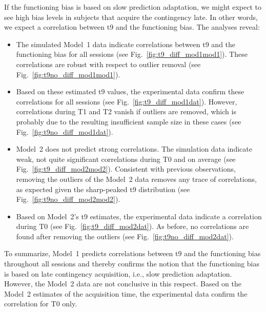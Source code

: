 \documentclass[a4paper]{scrreprt}
\begin{document}
If the functioning bias is based on slow prediction adaptation, we might expect to see high bias levels in subjects that acquire the contingency late. In other words, we expect a correlation between t9 and the functioning bias. The analyses reveal:
\begin{itemize}
\item The simulated Model~1 data indicate correlations between t9 and the functioning bias for all sessions (see Fig.~\ref{fig:t9_diff_mod1mod1}). These correlations are robust with respect to outlier removal (see Fig.~\ref{fig:t9no_diff_mod1mod1}).
\item Based on these estimated t9 values, the experimental data confirm these correlations for all sessions (see Fig.~\ref{fig:t9_diff_mod1dat}). However, correlations during T1 and T2 vanish if outliers are removed, which is probably due to the resulting insufficient sample size in these cases (see Fig.~\ref{fig:t9no_diff_mod1dat}).
\item Model~2 does not predict strong correlations. The simulation data indicate weak, not quite significant correlations during T0 and on average (see Fig.~\ref{fig:t9_diff_mod2mod2}). Consistent with previous observations, removing the outliers of the Model~2 data removes any trace of correlations, as expected given the sharp-peaked t9 distribution (see Fig.~\ref{fig:t9no_diff_mod2mod2}).
\item Based on Model~2's t9 estimates, the experimental data indicate a correlation during T0 (see Fig.~\ref{fig:t9_diff_mod2dat}). As before, no correlations are found after removing the outliers (see Fig.~\ref{fig:t9no_diff_mod2dat}).
\end{itemize}
To summarize, Model~1 predicts correlations between t9 and the functioning bias throughout all sessions and thereby confirms the notion that the functioning bias is based on late contingency acquisition, i.e., slow prediction adaptation. However, the Model~2 data are not conclusive in this respect. Based on the Model~2 estimates of the acquisition time, the experimental data confirm the correlation for T0 only.
\end{document}
